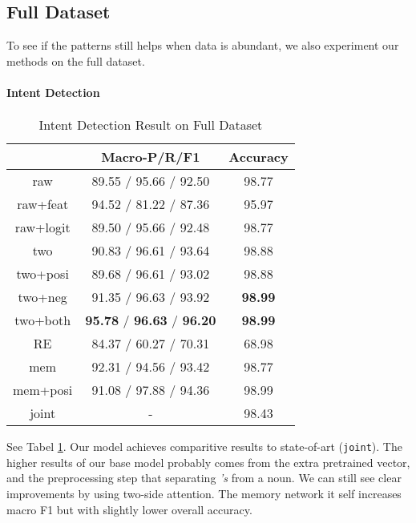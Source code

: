 \subsection{Full Dataset}
To see if the \RE patterns still helps when data is abundant, we also experiment our methods on the full dataset.

\paragraph{Intent Detection}

\begin{table}
\setlength{\tabcolsep}{0.23em}
\centering
\small{
\begin{tabular}{|c|c|c|}

\hline
  & Macro-P/R/F1 & Accuracy  \\
\hline
raw & 89.55 / 95.66 / 92.50 & 98.77  \\
\hline
raw+feat & 94.52 / 81.22 / 87.36 & 95.97  \\
\hline
raw+logit & 89.50 / 95.66 / 92.48 & 98.77  \\
\hline
two & 90.83 / 96.61 / 93.64 & 98.88 \\
\hline
two+posi & 89.68 / 96.61 / 93.02 & 98.88 \\
\hline
two+neg & 91.35 / 96.63 / 93.92 & \textbf{98.99} \\
\hline
two+both & \textbf{95.78} / \textbf{96.63} / \textbf{96.20} & \textbf{98.99} \\
\hline
\hline
RE & 84.37 / 60.27 / 70.31 & 68.98 \\
\hline
mem & 92.31 / 94.56 / 93.42 & 98.77 \\
\hline
mem+posi & 91.08 / 97.88 / 94.36 & 98.99 \\
\hline
joint & - & 98.43 \\
\hline 

\end{tabular}
}
\caption{Intent Detection Result on Full Dataset}
\label{tab_intent_full}
\end{table}

See Tabel \ref{tab_intent_full}.
Our model achieves comparitive results to state-of-art (\texttt{joint}). The higher results of our base model probably comes from the extra pretrained vector, and the preprocessing step that separating \emph{'s} from a noun. We can still see clear improvements by using two-side attention. The memory network it self increases macro F1 but with slightly lower overall accuracy. 


